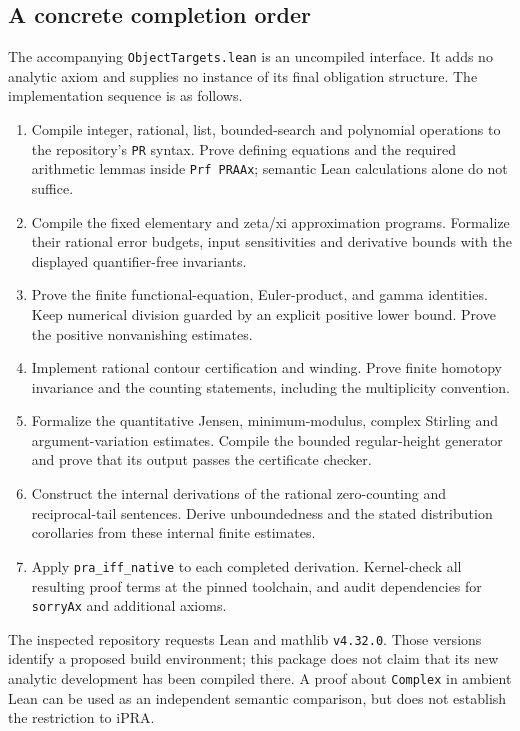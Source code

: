 \subsection{A concrete completion order}
The accompanying \texttt{ObjectTargets.lean} is an uncompiled interface.
It adds no analytic axiom and supplies no instance of its final obligation
structure. The implementation sequence is as follows.
\begin{enumerate}
\item Compile integer, rational, list, bounded-search and polynomial
      operations to the repository's \texttt{PR} syntax. Prove defining
      equations and the required arithmetic lemmas inside
      \texttt{Prf PRAAx}; semantic Lean calculations alone do not suffice.
\item Compile the fixed elementary and zeta/xi approximation programs.
      Formalize their rational error budgets, input sensitivities and
      derivative bounds with the displayed quantifier-free invariants.
\item Prove the finite functional-equation, Euler-product, and gamma
      identities. Keep numerical division guarded by an explicit positive
      lower bound. Prove the positive nonvanishing estimates.
\item Implement rational contour certification and winding. Prove
      finite homotopy invariance and the counting statements, including
      the multiplicity convention.
\item Formalize the quantitative Jensen, minimum-modulus, complex
      Stirling and argument-variation estimates. Compile the bounded
      regular-height generator and prove that its output passes the
      certificate checker.
\item Construct the internal derivations of the rational zero-counting
      and reciprocal-tail sentences. Derive unboundedness and the stated
      distribution corollaries from these internal finite estimates.
\item Apply \texttt{pra\_iff\_native} to each completed derivation.
      Kernel-check all resulting proof terms at the pinned toolchain,
      and audit dependencies for \texttt{sorryAx} and additional axioms.
\end{enumerate}
The inspected repository requests Lean and mathlib \texttt{v4.32.0}.
Those versions identify a proposed build environment; this package does not
claim that its new analytic development has been compiled there. A proof
about \texttt{Complex} in ambient Lean can be used as an independent
semantic comparison, but does not establish the restriction to iPRA.
